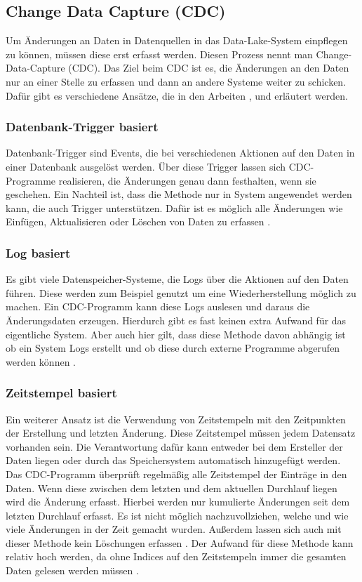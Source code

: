 \subsection{Change Data Capture (CDC)}
\label{sec:cdc}

Um Änderungen an Daten in Datenquellen in das Data-Lake-System einpflegen zu können, müssen diese erst erfasst werden.
Diesen Prozess nennt man Change-Data-Capture (CDC).
Das Ziel beim CDC ist es, die Änderungen an den Daten nur an einer Stelle zu erfassen und dann an andere Systeme weiter zu schicken.
Dafür gibt es verschiedene Ansätze, die in den Arbeiten \parencite{delta-view_gen}, \parencite{cdc_in_nosql} und \parencite{boeing} erläutert werden.

\subsubsection{Datenbank-Trigger basiert}
Datenbank-Trigger sind Events, die bei verschiedenen Aktionen auf den Daten in einer Datenbank ausgelöst werden.
Über diese Trigger lassen sich CDC-Programme realisieren, die Änderungen genau dann festhalten, wenn sie geschehen.
Ein Nachteil ist, dass die Methode nur in System angewendet werden kann, die auch Trigger unterstützen.
Dafür ist es möglich alle Änderungen wie Einfügen, Aktualisieren oder Löschen von Daten zu erfassen \parencite{boeing}.

\subsubsection{Log basiert}
Es gibt viele Datenspeicher-Systeme, die Logs über die Aktionen auf den Daten führen.
Diese werden zum Beispiel genutzt um eine Wiederherstellung möglich zu machen.
Ein CDC-Programm kann diese Logs auslesen und daraus die Änderungsdaten erzeugen.
Hierdurch gibt es fast keinen extra Aufwand für das eigentliche System.
Aber auch hier gilt, dass diese Methode davon abhängig ist ob ein System Logs erstellt und ob diese durch externe Programme abgerufen werden können \parencite{delta-view_gen}.


\subsubsection{Zeitstempel basiert}
Ein weiterer Ansatz ist die Verwendung von Zeitstempeln mit den Zeitpunkten der Erstellung und letzten Änderung.
Diese Zeitstempel müssen jedem Datensatz vorhanden sein.
Die Verantwortung dafür kann entweder bei dem Ersteller der Daten liegen oder durch das Speichersystem automatisch hinzugefügt werden.
Das CDC-Programm überprüft regelmäßig alle Zeitstempel der Einträge in den Daten.
Wenn diese zwischen dem letzten und dem aktuellen Durchlauf liegen wird die Änderung erfasst.
Hierbei werden nur kumulierte Änderungen seit dem letzten Durchlauf erfasst.
Es ist nicht möglich nachzuvollziehen, welche und wie viele Änderungen in der Zeit gemacht wurden.
Außerdem lassen sich auch mit dieser Methode kein Löschungen erfassen \parencite{delta-view_gen}.
Der Aufwand für diese Methode kann relativ hoch werden, da ohne Indices auf den Zeitstempeln immer die gesamten Daten gelesen werden müssen \cite{boeing}.

